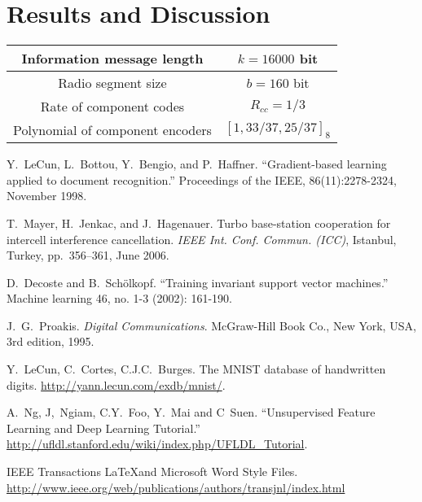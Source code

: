 \documentclass[journal, a4paper]{IEEEtran}
\begin{document}
		
\section {Results and Discussion}

	\begin{table}[!hbt]
		\begin{center}
		\label{tab:results}
		\begin{tabular}{|c|c|}
			\hline
			Information message length & $k=16000$ bit \\
			\hline
			Radio segment size & $b=160$ bit \\
			\hline
			Rate of component codes & $R_{cc}=1/3$\\
			\hline
			Polynomial of component encoders & $[1 , 33/37 , 25/37]_8$\\
			\hline
		\end{tabular}
		\end{center}
	\end{table}



\begin{thebibliography}{5}

	Y.~LeCun, L.~Bottou, Y.~Bengio, and P.~Haffner. ``Gradient-based learning applied to document recognition.'' Proceedings of the IEEE, 86(11):2278-2324, November 1998.
	
	T.~Mayer, H.~Jenkac, and J.~Hagenauer. Turbo base-station cooperation for intercell interference cancellation. {\em IEEE Int. Conf. Commun. (ICC)}, Istanbul, Turkey, pp.~356--361, June 2006.
	
	D.~Decoste and B.~Schölkopf. ``Training invariant support vector machines.'' Machine learning 46, no. 1-3 (2002): 161-190.

	J.~G.~Proakis. {\em Digital Communications}. McGraw-Hill Book Co.,
	New York, USA, 3rd edition, 1995.

	Y.~LeCun, C.~Cortes, C.J.C.~Burges. The MNIST database of handwritten digits.
	\url{http://yann.lecun.com/exdb/mnist/}.
	
	A.~Ng, J,~Ngiam, C.Y.~Foo, Y.~Mai and C~Suen. ``Unsupervised Feature Learning and Deep Learning Tutorial.''
	\url{http://ufldl.stanford.edu/wiki/index.php/UFLDL_Tutorial}.

	IEEE Transactions \LaTeX and Microsoft Word Style Files.
	\url{http://www.ieee.org/web/publications/authors/transjnl/index.html}

\end{thebibliography}

\end{document}
